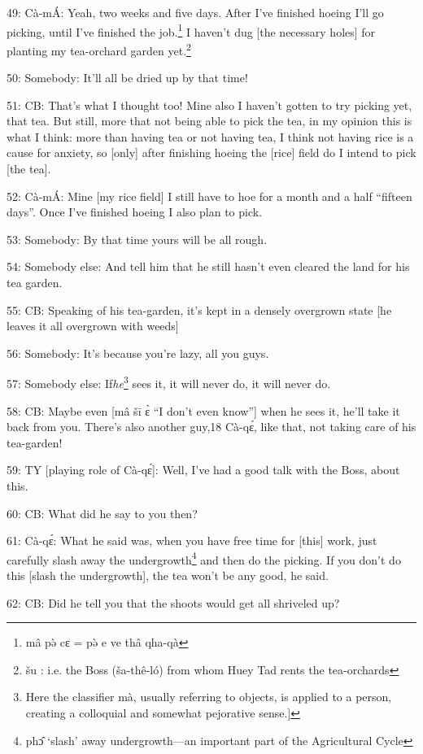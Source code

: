 49: Cà-mÁ: Yeah, two weeks and five days.  After I've finished hoeing I'll go
picking, until I've finished the job.\footnote{mâ pə̀ cɛ = pə̀ e ve thâ qha-qà}  I haven't dug [the necessary holes]
for planting my tea-orchard garden yet.\footnote{šu\textit{ }: i.e. the Boss (ša-thê-ló) from whom Huey Tad rents the tea-orchards}

50: Somebody: It'll all be dried up by that time!

51: CB: That's what I thought too!  Mine also I haven't gotten to try picking yet,
that tea.  But still, more that not being able to pick the tea, in my opinion this
is what I think: more than having tea or not having tea, I think not having rice
is a cause for anxiety, so [only] after finishing hoeing the [rice] field do I
intend to pick [the tea].

52: Cà-mÁ: Mine [my rice field] I still have to hoe for a month and a half ``fifteen
days''.  Once I've finished hoeing I also plan to pick.

53: Somebody: By that time yours will be all rough.

54: Somebody else: And tell him that he still hasn't even cleared the land for
his tea garden.

55: CB: Speaking of his tea-garden, it's kept in a densely overgrown state [he
leaves it all overgrown with weeds]

56: Somebody: It's because you're lazy, all you guys.

57: Somebody else: If\textit{he}\footnote{Here the classifier mà, usually referring to objects, is applied to a person, creating a colloquial and somewhat pejorative sense.]} sees it, it will never do, it will never do.

58: CB: Maybe even [mâ šī ɛ̀ ``I don't even know''] when he sees it, he'll
take it back from you.  There's also another guy,18 Cà-qɛ́,\textit{ }like that,
not taking care of his tea-garden!

59: TY [playing role of Cà-qɛ́]: Well, I've had a good talk with the Boss, about
this.

60: CB: What did he say to you then?

61: Cà-qɛ́: What he said was, when you have free time for [this] work, just
carefully slash away the undergrowth\footnote{phɔ̂ `slash' away undergrowth---an important part of the Agricultural Cycle} and then do the picking.  If you don't
do this [slash the undergrowth], the tea won't be any good, he said.

62: CB: Did he tell you that the shoots would get all shriveled up?

